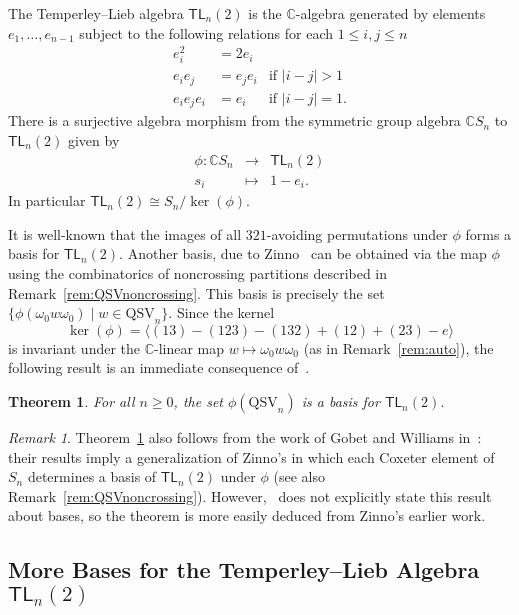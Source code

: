 \documentclass[12pt]{amsart}
\newtheorem{thm}[equation]{Theorem}
\theoremstyle{definition}
\theoremstyle{remark}
\newtheorem{rem}[equation]{Remark}
\numberwithin{equation}{section}
\newcommand{\CC}{\mathbb{C}}
\newcommand{\TL}{\mathsf{TL}}
\newcommand{\QSV}{\mathrm{QSV}}
\begin{document}
The Temperley--Lieb algebra $\TL_{n}(2)$ is the $\CC$-algebra generated by elements $e_{1}, \ldots, e_{n-1}$ subject to the following relations for each $1 \le i, j \le n$
\[
\begin{array}{rll}
e_{i}^{2} &= 2 e_{i} \\
e_{i}e_{j} &= e_{j}e_{i} & \text{if $|i - j| > 1$} \\
e_{i} e_{j} e_{i} &= e_{i} & \text{if $|i - j| = 1$}.
\end{array}
\]
There is a surjective algebra morphism from the symmetric group algebra $\CC S_{n}$ to $\TL_{n}(2)$ given by 
\[
\begin{array}{rcl}
\phi: \CC S_{n} & \longrightarrow & \TL_{n}(2) \\
s_{i} & \longmapsto & 1 - e_{i}.
\end{array}
\]
In particular $\TL_{n}(2)\cong S_n\big/\!\ker(\phi)$.

It is well-known that the images of all $321$-avoiding permutations under $\phi$ forms a basis for $\TL_{n}(2)$.  
Another basis, due to Zinno~\cite{Zinno} can be obtained via the map $\phi$ using the combinatorics of noncrossing partitions described in Remark~\ref{rem:QSVnoncrossing}.  This basis is precisely the set $\{\phi(\omega_0w\omega_0) \;|\; w \in \QSV_{n}\}$.  Since the kernel
\[
\ker(\phi) = \langle (13) - (123) - (132) + (12) + (23) - e \rangle
\]
is invariant under the $\CC$-linear map $w \mapsto \omega_0w\omega_0$ (as in Remark~\ref{rem:auto}), the following result is an immediate consequence of~\cite[Theorem 2]{Zinno}.

\begin{thm}
\label{thm:TLbasis}
For all $n \ge 0$, the set $\phi(\QSV_{n})$ is a basis for $\TL_{n}(2)$.
\end{thm}

\begin{rem}
Theorem~\ref{thm:TLbasis} also follows from the work of Gobet and Williams in~\cite{GobetWilliams}: their results imply a  generalization of Zinno's in which each Coxeter element of $S_{n}$ determines a basis of $\TL_{n}(2)$ under $\phi$ (see also Remark~\ref{rem:QSVnoncrossing}).  
However,~\cite{GobetWilliams} does not explicitly state this result about bases, so the theorem is more easily deduced from Zinno's earlier work.
\end{rem}

\subsection{More Bases for the Temperley--Lieb Algebra $\TL_{n}(2)$}
\end{document}
